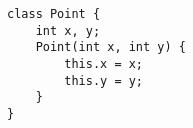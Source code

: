 \begin{lstlisting}
class Point {
    int x, y;
    Point(int x, int y) {
        this.x = x;
        this.y = y;
    }
}
\end{lstlisting}
